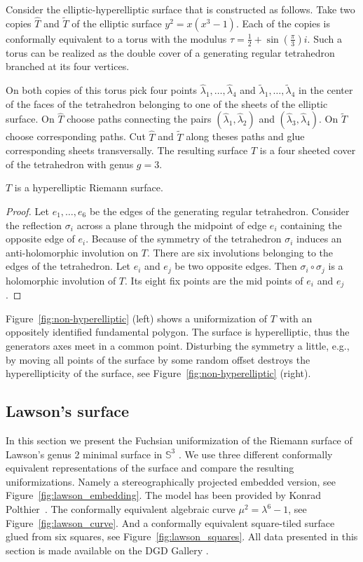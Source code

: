 \documentclass[Thesis.tex]{subfiles}
\begin{document}
Consider the elliptic-hyperelliptic surface that is constructed as follows. Take two copies $\hat T$ and $\tilde T$ of the elliptic surface $y^2=x(x^3 - 1)$. Each of the copies is conformally equivalent to a torus with the modulus $\tau=\frac{1}{2}+\sin(\frac{\pi}{3})i$. Such a torus can be realized as the double cover of a generating regular tetrahedron branched at its four vertices.

On both copies of this torus pick four points $\hat\lambda_1,\ldots,\hat\lambda_4$ and $\tilde\lambda_1,\ldots,\tilde\lambda_4$ in the center of the faces of the tetrahedron belonging to one of the sheets of the elliptic surface. On $\hat T$ choose paths connecting the pairs $(\hat\lambda_1,\hat\lambda_2)$ and $(\hat\lambda_3,\hat\lambda_4)$. On $\tilde T$ choose corresponding paths. Cut $\hat T$ and $\tilde T$ along theses paths and glue corresponding sheets transversally. The resulting surface $T$ is a four sheeted cover of the tetrahedron with genus $g = 3$.

\begin{theorem}
$T$ is a hyperelliptic Riemann surface.
\begin{proof}
Let $e_1,\ldots,e_6$ be the edges of the generating regular tetrahedron. Consider the reflection $\sigma_i$ across a plane through the midpoint of edge $e_i$ containing the opposite edge of $e_i$.  Because of the symmetry of the tetrahedron $\sigma_i$ induces an anti-holomorphic involution on $T$. There are six involutions belonging to the edges of the tetrahedron. Let $e_i$ and $e_j$ be two opposite edges. Then $\sigma_i \circ \sigma_j$ is a holomorphic involution of $T$. Its eight fix points are the mid points of $e_i$ and $e_j$.
\end{proof}
\end{theorem}

Figure~\ref{fig:non-hyperelliptic} (left) shows a uniformization of $T$ with an oppositely identified fundamental polygon. The surface is hyperelliptic, thus the generators axes meet in a common point. Disturbing the symmetry a little, e.g., by moving all points of the surface by some random offset destroys the hyperellipticity of the surface, see Figure~\ref{fig:non-hyperelliptic} (right).



\subsection{Lawson's surface}

In this section we present the Fuchsian uniformization of the Riemann surface of Lawson's genus 2 minimal surface in $\mathbb{S}^3$ \cite{Law1970}.
We use three different conformally equivalent representations of the surface and compare the resulting uniformizations.
Namely a stereographically projected embedded version, see Figure~\ref{fig:lawson_embedding}.
The model has been provided by Konrad Polthier~\cite{polthier97}.
The conformally equivalent algebraic curve $\mu^2=\lambda^6-1$, see Figure~\ref{fig:lawson_curve}.
And a conformally equivalent square-tiled surface glued from six squares, see Figure~\ref{fig:lawson_squares}.
All data presented in this section is made available on the {\sc DGD Gallery} \cite{gallery-lawson-webpage}.
\end{document}
